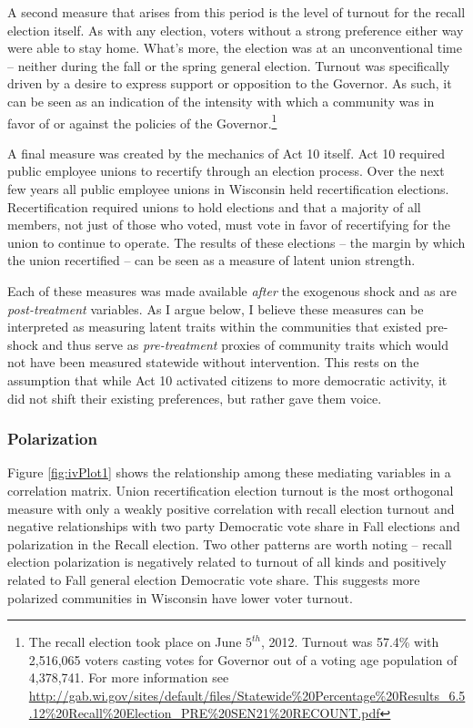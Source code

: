 A second measure that arises from this period is the level of turnout for the 
recall election itself. As with any election, voters without a strong preference 
either way were able to stay home. What's more, the election was at an unconventional 
time -- neither during the fall or the spring general election. Turnout was 
specifically driven by a desire to express support or opposition to the Governor. 
As such, it can be seen as an indication of the intensity with which a community 
was in favor of or against the policies of the Governor.\footnote{The recall election 
took place on June $5^{th}$, 2012. Turnout was 57.4\% with 2,516,065 voters 
casting votes for Governor out of a voting age population of 4,378,741. For more 
information see \url{http://gab.wi.gov/sites/default/files/Statewide\%20Percentage\%20Results_6.5.12\%20Recall\%20Election\_PRE\%20SEN21\%20RECOUNT.pdf}}

A final measure was created by the mechanics of Act 10 itself. Act 10 required 
public employee unions to recertify through an election process. Over the next 
few years all public employee unions in Wisconsin held recertification elections. 
Recertification required unions to hold elections and that a majority of all 
members, not just of those who voted, must vote in favor of recertifying for 
the union to continue to operate. The results of these elections -- the margin 
by which the union recertified -- can be seen as a measure of latent union 
strength. 

Each of these measures was made available \emph{after} the exogenous shock and 
as are \emph{post-treatment} variables. As I argue below, I believe these measures 
can be interpreted as measuring latent traits within the communities  that existed pre-shock 
and thus serve as \emph{pre-treatment} proxies of community traits which would 
not have been measured statewide without intervention. This rests on the assumption that 
while Act 10 activated citizens to more democratic activity, it did not shift their 
existing preferences, but rather gave them voice.

\subsubsection{Polarization}

Figure \ref{fig:ivPlot1} shows the relationship among these mediating variables 
in a correlation matrix. Union recertification election turnout is the most 
orthogonal measure with only a weakly positive correlation with recall election 
turnout and negative relationships with two party Democratic vote share in Fall 
elections and polarization in the Recall election. Two other patterns are worth 
noting -- recall election polarization is negatively related to turnout of all kinds 
and positively related to Fall general election Democratic vote share. This 
suggests more polarized communities in Wisconsin have lower voter turnout. 


